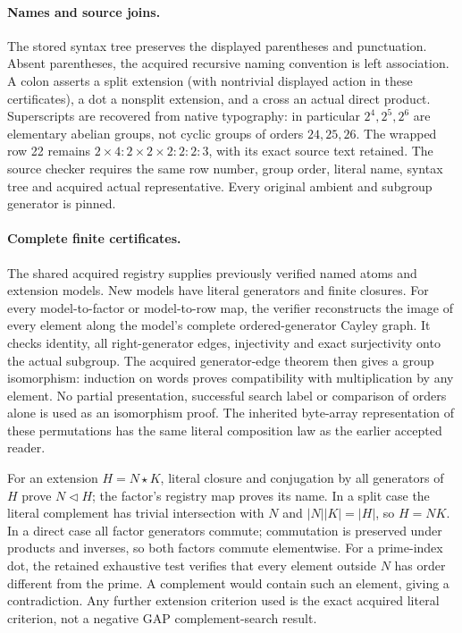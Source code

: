 \documentclass[11pt]{article}
\begin{document}
\paragraph{Names and source joins.}
The stored syntax tree preserves the displayed parentheses and punctuation.
Absent parentheses, the acquired recursive naming convention is left
association. A colon asserts a split extension (with nontrivial displayed
action in these certificates), a dot a nonsplit extension, and a cross an
actual direct product. Superscripts are recovered from native typography:
in particular $2^4,2^5,2^6$ are elementary abelian groups, not cyclic groups
of orders $24,25,26$. The wrapped row 22 remains
$2\times4:2\times2\times2:2:2:3$, with its exact source text retained.
The source checker requires the same row number, group order, literal
name, syntax tree and acquired actual representative. Every original
ambient and subgroup generator is pinned.

\newpage
\paragraph{Complete finite certificates.}
The shared acquired registry supplies previously verified named atoms and
extension models. New models have literal generators and finite closures.
For every model-to-factor or model-to-row map, the verifier reconstructs the
image of every element along the model's complete ordered-generator Cayley
graph. It checks identity, all right-generator edges, injectivity and exact
surjectivity onto the actual subgroup. The acquired generator-edge theorem
then gives a group isomorphism: induction on words proves compatibility
with multiplication by any element. No partial presentation, successful
search label or comparison of orders alone is used as an isomorphism proof.
The inherited byte-array representation of these permutations has the same
literal composition law as the earlier accepted reader.

For an extension $H=N\mathbin{\star}K$, literal closure and conjugation by
all generators of $H$ prove $N\lhd H$; the factor's registry map proves its
name. In a split case the literal complement has trivial intersection with
$N$ and $|N||K|=|H|$, so $H=NK$. In a direct case all factor generators
commute; commutation is preserved under products and inverses, so both
factors commute elementwise.
For a prime-index dot, the retained exhaustive test verifies that every
element outside $N$ has order different from the prime. A complement would
contain such an element, giving a contradiction. Any further extension
criterion used is the exact acquired literal criterion, not a negative GAP
complement-search result.
\end{document}
